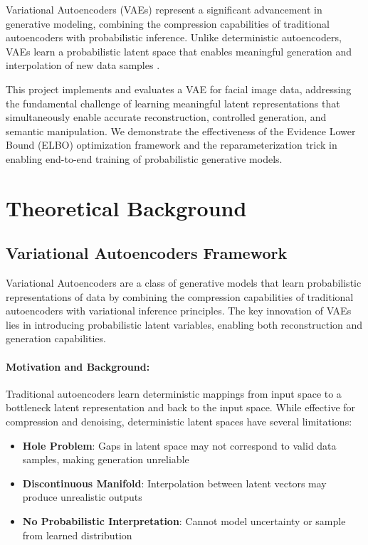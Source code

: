 \documentclass[conference]{IEEEtran}
\begin{document}
Variational Autoencoders (VAEs) represent a significant advancement in generative modeling, combining the compression capabilities of traditional autoencoders with probabilistic inference. Unlike deterministic autoencoders, VAEs learn a probabilistic latent space that enables meaningful generation and interpolation of new data samples \cite{kingma2013auto}.

This project implements and evaluates a VAE for facial image data, addressing the fundamental challenge of learning meaningful latent representations that simultaneously enable accurate reconstruction, controlled generation, and semantic manipulation. We demonstrate the effectiveness of the Evidence Lower Bound (ELBO) optimization framework and the reparameterization trick in enabling end-to-end training of probabilistic generative models.

\section{Theoretical Background}

\subsection{Variational Autoencoders Framework}

Variational Autoencoders are a class of generative models that learn probabilistic representations of data by combining the compression capabilities of traditional autoencoders with variational inference principles. The key innovation of VAEs lies in introducing probabilistic latent variables, enabling both reconstruction and generation capabilities.

\paragraph{Motivation and Background:}
Traditional autoencoders learn deterministic mappings from input space to a bottleneck latent representation and back to the input space. While effective for compression and denoising, deterministic latent spaces have several limitations:
\begin{itemize}
    \item \textbf{Hole Problem}: Gaps in latent space may not correspond to valid data samples, making generation unreliable
    \item \textbf{Discontinuous Manifold}: Interpolation between latent vectors may produce unrealistic outputs
    \item \textbf{No Probabilistic Interpretation}: Cannot model uncertainty or sample from learned distribution
\end{itemize}
\end{document}
